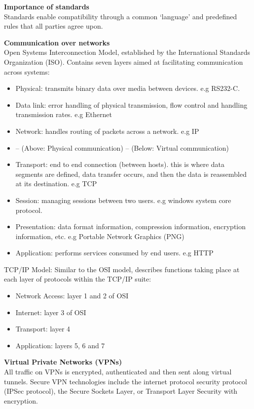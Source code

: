 \documentclass{article}
\begin{document}
\textbf{Importance of standards} \\
Standards enable compatibility through a common `language' and predefined rules
that all parties agree upon.

\textbf{Communication over networks} \\
Open Systems Interconnection Model, established by the International Standards
Organization (ISO). Contains seven layers aimed at facilitating communication
across systems:
\begin{itemize}
    \item Physical: transmits binary data over media between devices. e.g
        RS232-C.
    \item Data link: error handling of physical transmission, flow control and
        handling transmission rates. e.g Ethernet
    \item Network: handles routing of packets across a network. e.g IP
    \item -- (Above: Physical communication) -- (Below: Virtual communication)
    \item Transport: end to end connection (between hosts). this is where data
        segments are defined, data transfer occurs, and then the data is
        reassembled at its destination. e.g TCP
    \item Session: managing sessions between two users. e.g windows system core
        protocol.
    \item Presentation: data format information, compression information,
        encryption information, etc. e.g Portable Network Graphics (PNG)
    \item Application: performs services consumed by end users. e.g HTTP
\end{itemize}

TCP/IP Model: Similar to the OSI model, describes functions taking
place at each layer of protocols within the TCP/IP suite:
\begin{itemize}
    \item Network Access: layer 1 and 2 of OSI
    \item Internet: layer 3 of OSI
    \item Transport: layer 4
    \item Application: layers 5, 6 and 7
\end{itemize}

\textbf{Virtual Private Networks (VPNs)} \\
All traffic on VPNs is encrypted, authenticated and then sent along virtual
tunnels. Secure VPN technologies include the internet protocol security
protocol (IPSec protocol), the Secure Sockets Layer, or Transport Layer
Security with encryption.
\end{document}
